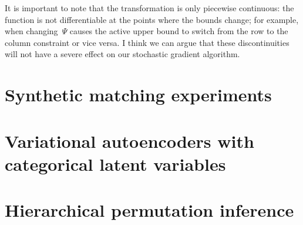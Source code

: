 \documentclass{article}
\begin{document}
It is important to note that the transformation is only piecewise
continuous: the function is not differentiable at the points where
the bounds change; for example, when changing~$\Psi$ causes the
active upper bound to switch from the row to the column constraint
or vice versa.  I think we can argue that these discontinuities
will not have a severe effect on our stochastic gradient algorithm.

\section{Synthetic matching experiments}
\label{sec:synthetic}

\section{Variational autoencoders with categorical latent variables}
\label{sec:vae}

\section{Hierarchical permutation inference}
\label{sec:synth_celegans}






\appendix
\end{document}
